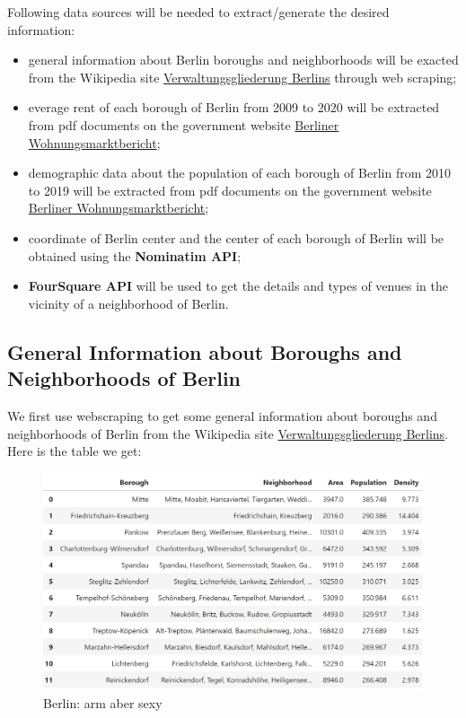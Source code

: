 \documentclass[11pt]{article}
\begin{document}
Following data sources will be needed to extract/generate the desired
information: 
\begin{itemize} 
    \item general information about Berlin boroughs and
neighborhoods will be exacted from the Wikipedia site
\href{https://de.wikipedia.org/wiki/Verwaltungsgliederung_Berlins}{Verwaltungsgliederung
Berlins} through web scraping; 
   \item everage rent of each borough of Berlin
from 2009 to 2020 will be extracted from pdf documents on the government
website
\href{https://www.stadtentwicklung.berlin.de/wohnen/wohnungsmarktbericht/}{Berliner
Wohnungsmarktbericht}; 
   \item demographic data about the population of each
borough of Berlin from 2010 to 2019 will be extracted from pdf documents
on the government website
\href{https://www.stadtentwicklung.berlin.de/wohnen/wohnungsmarktbericht/}{Berliner
Wohnungsmarktbericht}; 
   \item coordinate of Berlin center and the center of
each borough of Berlin will be obtained using the \textbf{Nominatim
API}; 
   \item \textbf{FourSquare API} will be used to get the details and
types of venues in the vicinity of a neighborhood of Berlin.
\end{itemize}

    \hypertarget{general-information-about-boroughs-and-neighborhoods-of-berlin}{%
\subsection{General Information about Boroughs and Neighborhoods of
Berlin}\label{general-information-about-boroughs-and-neighborhoods-of-berlin}}

We first use webscraping to get some general information about
boroughs and neighborhoods of Berlin from the Wikipedia site
\href{https://de.wikipedia.org/wiki/Verwaltungsgliederung_Berlins}{Verwaltungsgliederung
Berlins}. Here is the table we get:

  \begin{figure}
\centering
\includegraphics[scale=1]{"Screenshot (27).png"}
\caption{Berlin: arm aber sexy}
\end{figure}
\end{document}
